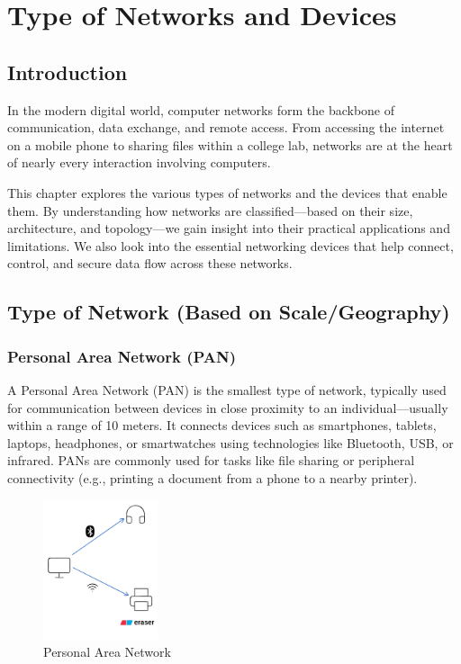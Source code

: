 \chapter{Type of Networks and Devices}

\section{Introduction}
In the modern digital world, computer networks form the backbone of communication, data exchange, and remote access. From accessing the internet on a mobile phone to sharing files within a college lab, networks are at the heart of nearly every interaction involving computers.

This chapter explores the various types of networks and the devices that enable them. By understanding how networks are classified—based on their size, architecture, and topology—we gain insight into their practical applications and limitations. We also look into the essential networking devices that help connect, control, and secure data flow across these networks.

\section{Type of Network (Based on Scale/Geography)}

\subsection{Personal Area Network (PAN)}
A Personal Area Network (PAN) is the smallest type of network, typically used for communication between devices in close proximity to an individual—usually within a range of 10 meters. It connects devices such as smartphones, tablets, laptops, headphones, or smartwatches using technologies like Bluetooth, USB, or infrared. PANs are commonly used for tasks like file sharing or peripheral connectivity (e.g., printing a document from a phone to a nearby printer).

\begin{figure}[H]
    \centering
    \includegraphics[width=0.3\textwidth]{images/chapter2/pan.png}
    \caption{Personal Area Network}
    \label{fig:pan}
\end{figure}


